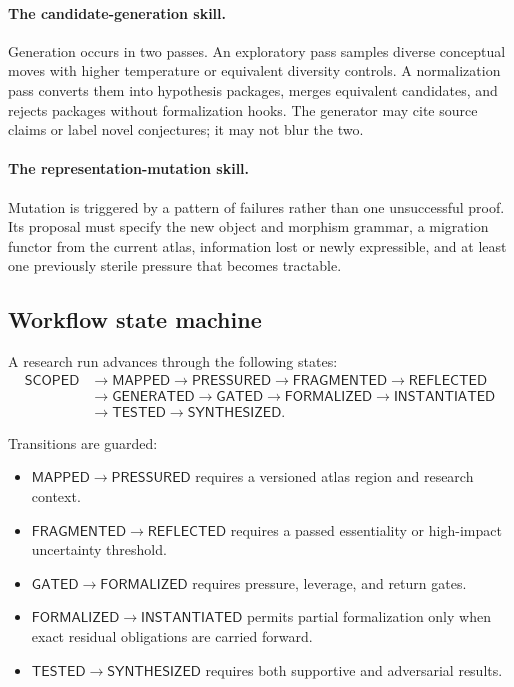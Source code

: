 \documentclass[11pt]{article}
\begin{document}
\paragraph{The candidate-generation skill.}
Generation occurs in two passes. An exploratory pass samples diverse conceptual moves with higher
temperature or equivalent diversity controls. A normalization pass converts them into hypothesis
packages, merges equivalent candidates, and rejects packages without formalization hooks. The
generator may cite source claims or label novel conjectures; it may not blur the two.

\paragraph{The representation-mutation skill.}
Mutation is triggered by a pattern of failures rather than one unsuccessful proof. Its proposal must
specify the new object and morphism grammar, a migration functor from the current atlas, information
lost or newly expressible, and at least one previously sterile pressure that becomes tractable.

\subsection{Workflow state machine}

A research run advances through the following states:
\begin{equation}
\begin{split}
\mathsf{SCOPED}&\to\mathsf{MAPPED}\to\mathsf{PRESSURED}\to
\mathsf{FRAGMENTED}\to\mathsf{REFLECTED}\\
&\to\mathsf{GENERATED}\to\mathsf{GATED}\to
\mathsf{FORMALIZED}\to\mathsf{INSTANTIATED}\\
&\to\mathsf{TESTED}\to\mathsf{SYNTHESIZED}.
\end{split}
\label{eq:state-machine}
\end{equation}

Transitions are guarded:
\begin{itemize}
  \item \(\mathsf{MAPPED}\to\mathsf{PRESSURED}\) requires a versioned atlas region and research context.
  \item \(\mathsf{FRAGMENTED}\to\mathsf{REFLECTED}\) requires a passed essentiality or high-impact
  uncertainty threshold.
  \item \(\mathsf{GATED}\to\mathsf{FORMALIZED}\) requires pressure, leverage, and return gates.
  \item \(\mathsf{FORMALIZED}\to\mathsf{INSTANTIATED}\) permits partial formalization only when exact
  residual obligations are carried forward.
  \item \(\mathsf{TESTED}\to\mathsf{SYNTHESIZED}\) requires both supportive and adversarial results.
\end{itemize}
\end{document}

